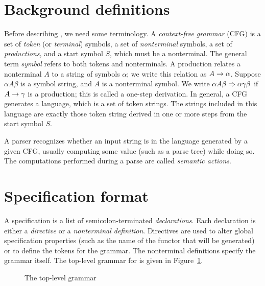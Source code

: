 \section{Background definitions}

Before describing \antlr{}, we need some terminology.  A \emph{context-free grammar} (CFG) is a set of \emph{token} (or \emph{terminal}) symbols, a set of \emph{nonterminal} symbols, a set of \emph{productions}, and a start symbol $S$, which must be a nonterminal.  
The general term \emph{symbol} refers to both tokens and nonterminals.  A production relates a nonterminal $A$ to a string of symbols $\alpha$; we write this relation as $A \rightarrow \alpha$.  Suppose $\alpha A \beta$ is a symbol string, and $A$ is a nonterminal symbol.  We write $\alpha A \beta \Rightarrow \alpha \gamma \beta$ if $A \rightarrow \gamma$ is a production; this is called a one-step derivation.  In general, a CFG generates a language, which is a set of token strings.  The strings included in this language are exactly those token string derived in one or more steps from the start symbol $S$.

A parser recognizes whether an input string is in the language generated by a given CFG, usually computing some value (such as a parse tree) while doing so.  The computations performed during a parse are called \emph{semantic actions}.

\section{Specification format}

A \antlr{} specification is a list of semicolon-terminated \emph{declarations}.  Each declaration is either a \emph{directive} or a \emph{nonterminal definition}.  Directives are used to alter global specification properties (such as the name of the functor that will be generated) or to define the tokens for the grammar.  The nonterminal definitions specify the grammar itself.  The top-level grammar for \antlr{} is given in Figure~\ref{fig:antlr-syntax}.

\begin{figure}
\caption{The top-level \antlr{} grammar}\label{fig:antlr-syntax}
\end{figure}

